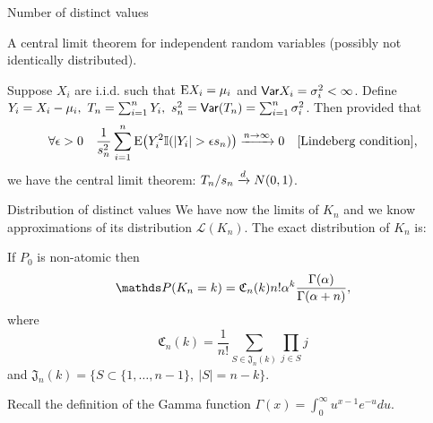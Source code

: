 \begin{frame}{Number of distinct values}

A central limit theorem for independent random variables (possibly not identically distributed).

\begin{theorem}
Suppose $X_i$ are i.i.d. such that $\mathrm{E} X_i = \mu_i$ and $\mathsf{Var} X_i = \sigma_i^2 <\infty$. Define $Y_i = X_i - \mu_i,\ T_n = \sum_{i=1}^n Y_i,\ s_n^2 = \mathsf{Var} (T_n) = \sum_{i=1}^n\sigma_i^2$. Then provided that
\begin{equation*}
    \forall \epsilon > 0\quad \frac{1}{s_n^2}\sum_{i=1}^n\E \big(Y_i^2 \mathbb{I}(|Y_i|>\epsilon s_n) \big)\xrightarrow{n\rightarrow \infty} 0 \quad \text{[Lindeberg condition],}
\end{equation*}
we have the central limit theorem: $T_n/s_n \xrightarrow{\small{d}}N(0,1)$.
\end{theorem}

\end{frame}


\begin{frame}{Distribution of distinct values}
	We have now the limits of $K_n$ and we know  approximations of its distribution $\mathcal{L}(K_n)$. The \alert{exact distribution of $K_n$} is:
\begin{proposition}[Distribution of $K_n$]
If $P_0$ is non-atomic then 
\begin{equation}\label{distr_of_Kn}
    \P(K_n=k) = \mathfrak{C}_n(k) n!\PrecisionParam ^k \frac{\Gamma(\PrecisionParam)}{\Gamma(\PrecisionParam+n)},
\end{equation}
where 
\begin{equation}\label{mathfrakC_def}
\mathfrak{C}_n(k)=\frac{1}{n!}\sum_{S\in\mathfrak{J}_n(k)} \prod_{j\in S}j    
\end{equation}
and $\mathfrak{J}_n(k)=\{ S\subset \{ 1,\ldots,n-1\},\ |S|=n-k \}$.
\end{proposition}

 Recall the definition of the \alert{Gamma function} $\Gamma(x)=\int_0^\infty u^{x-1}e^{-u}du$.
 
\end{frame}


